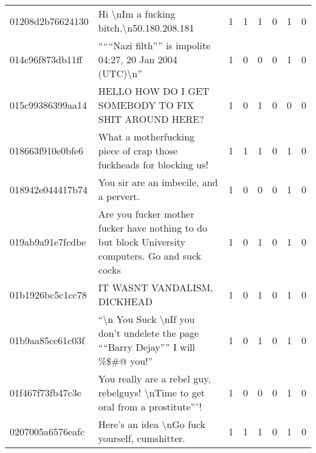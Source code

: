 \begin{center}
\begin{sidewaystable}[htb]
\begin{tabularx}{\textwidth}{L{0.8} L{6.6} C{0.1} C{0.1} C{0.1} C{0.1} C{0.1} C{0.1}}
            01208d2b76624130 & Hi \textbackslash nIm a fucking bitch.\textbackslash n50.180.208.181                                                             & 1           & 1           & 1           & 0           & 1           & 0           \\
            014c96f873db11ff & ``````Nazi filth'''' is impolite 04:27, 20 Jan 2004 (UTC)\textbackslash n''                                                      & 1           & 0           & 0           & 0           & 1           & 0           \\
            015c99386399aa14 & HELLO HOW DO I GET SOMEBODY TO FIX SHIT AROUND HERE?                                                                             & 1           & 0           & 1           & 0           & 0           & 0           \\
            018663f910e0bfe6 & What a motherfucking piece of crap those fuckheads for blocking us!                                                              & 1           & 1           & 1           & 0           & 1           & 0           \\
            018942e044417b74 & You sir are an imbecile, and a pervert.                                                                                          & 1           & 0           & 0           & 0           & 1           & 0           \\
            019ab9a91e7fcdbe & Are you fucker mother fucker have nothing to do but block University computers. Go and suck cocks                                & 1           & 0           & 1           & 0           & 1           & 0           \\
            01b1926bc5c1cc78 & IT WASNT VANDALISM, DICKHEAD                                                                                                     & 1           & 0           & 1           & 0           & 1           & 0           \\
            01b9aa85cc61c03f & ``\textbackslash n You Suck \textbackslash nIf you don't undelete the page ````Barry Dejay'''' I will \%\$\#@ you!''             & 1           & 0           & 1           & 0           & 1           & 0           \\
            01f467f73fb47c3e & You really are a rebel guy, rebelguys! \textbackslash nTime to get oral from a prostitute'''!                                    & 1           & 0           & 0           & 0           & 1           & 0           \\
            0207005a6576eafc & Here's an idea \textbackslash nGo fuck yourself, cumshitter.                                                                     & 1           & 1           & 1           & 0           & 1           & 0           \\

\end{tabularx}
\end{sidewaystable}
\end{center}
